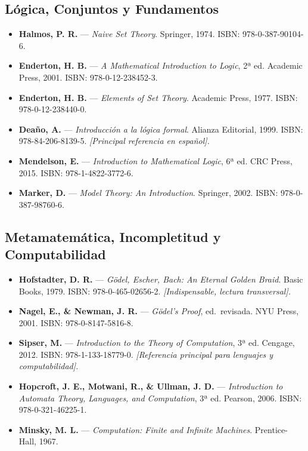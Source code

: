 \documentclass[11pt, letterpaper]{article}
\begin{document}
\subsection*{Lógica, Conjuntos y Fundamentos}
\begin{itemize}
  \item \textbf{Halmos, P. R.} — \emph{Naive Set Theory}. Springer, 1974. ISBN: 978-0-387-90104-6.
  \item \textbf{Enderton, H. B.} — \emph{A Mathematical Introduction to Logic}, 2ª ed. Academic Press, 2001. ISBN: 978-0-12-238452-3.
  \item \textbf{Enderton, H. B.} — \emph{Elements of Set Theory}. Academic Press, 1977. ISBN: 978-0-12-238440-0.
  \item \textbf{Deaño, A.} — \emph{Introducción a la lógica formal}. Alianza Editorial, 1999. ISBN: 978-84-206-8139-5. \textit{[Principal referencia en español].}
  \item \textbf{Mendelson, E.} — \emph{Introduction to Mathematical Logic}, 6ª ed. CRC Press, 2015. ISBN: 978-1-4822-3772-6.
  \item \textbf{Marker, D.} — \emph{Model Theory: An Introduction}. Springer, 2002. ISBN: 978-0-387-98760-6.
\end{itemize}

\subsection*{Metamatemática, Incompletitud y Computabilidad}
\begin{itemize}
  \item \textbf{Hofstadter, D. R.} — \emph{Gödel, Escher, Bach: An Eternal Golden Braid}. Basic Books, 1979. ISBN: 978-0-465-02656-2. \textit{[Indispensable, lectura transversal].}
  \item \textbf{Nagel, E., \& Newman, J. R.} — \emph{Gödel's Proof}, ed.\ revisada. NYU Press, 2001. ISBN: 978-0-8147-5816-8.
  \item \textbf{Sipser, M.} — \emph{Introduction to the Theory of Computation}, 3ª ed. Cengage, 2012. ISBN: 978-1-133-18779-0. \textit{[Referencia principal para lenguajes y computabilidad].}
  \item \textbf{Hopcroft, J. E., Motwani, R., \& Ullman, J. D.} — \emph{Introduction to Automata Theory, Languages, and Computation}, 3ª ed. Pearson, 2006. ISBN: 978-0-321-46225-1.
  \item \textbf{Minsky, M. L.} — \emph{Computation: Finite and Infinite Machines}. Prentice-Hall, 1967.
\end{itemize}
\end{document}
